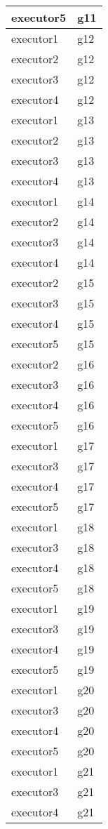 \begin{center}
\begin{longtable}[H]{|l|l|}
executor5 & g11 \\ \hline
executor1 & g12 \\ \hline
executor2 & g12 \\ \hline
executor3 & g12 \\ \hline
executor4 & g12 \\ \hline
executor1 & g13 \\ \hline
executor2 & g13 \\ \hline
executor3 & g13 \\ \hline
executor4 & g13 \\ \hline
executor1 & g14 \\ \hline
executor2 & g14 \\ \hline
executor3 & g14 \\ \hline
executor4 & g14 \\ \hline
executor2 & g15 \\ \hline
executor3 & g15 \\ \hline
executor4 & g15 \\ \hline
executor5 & g15 \\ \hline
executor2 & g16 \\ \hline
executor3 & g16 \\ \hline
executor4 & g16 \\ \hline
executor5 & g16 \\ \hline
executor1 & g17 \\ \hline
executor3 & g17 \\ \hline
executor4 & g17 \\ \hline
executor5 & g17 \\ \hline
executor1 & g18 \\ \hline
executor3 & g18 \\ \hline
executor4 & g18 \\ \hline
executor5 & g18 \\ \hline
executor1 & g19 \\ \hline
executor3 & g19 \\ \hline
executor4 & g19 \\ \hline
executor5 & g19 \\ \hline
executor1 & g20 \\ \hline
executor3 & g20 \\ \hline
executor4 & g20 \\ \hline
executor5 & g20 \\ \hline
executor1 & g21 \\ \hline
executor3 & g21 \\ \hline
executor4 & g21 \\ \hline

\end{longtable}
\end{center}
